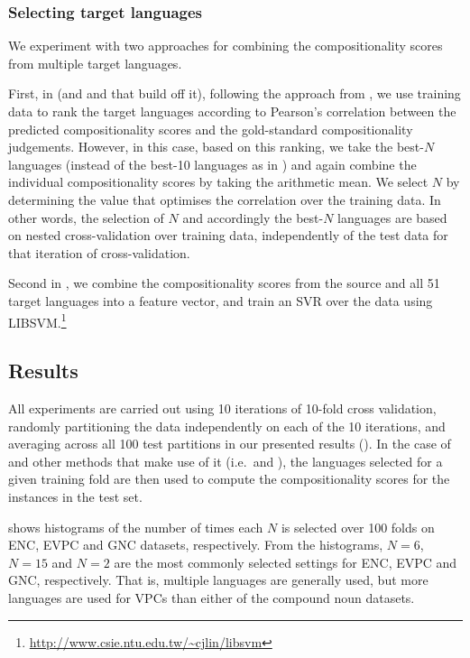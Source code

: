 \documentclass[output=paper,modfonts,nonflat]{langsci/langscibook}
\begin{document}
\subsubsection{Selecting target languages}
\label{sec:lang-selection}

We experiment with two approaches for combining the compositionality
scores from multiple target languages.

First, in \CStarg (and \CSsourcetarg and \CSall that build off it),
following the approach from , we use
training data to rank the target languages according to Pearson's
correlation between the predicted compositionality scores and the
gold-standard compositionality judgements. However, in this case,
based on this ranking, we take the best-$N$ languages (instead of the
best-10 languages as in ) and again
combine the individual compositionality scores by taking the
arithmetic mean. We select $N$ by determining the value that optimises
the correlation over the training data. In other words, the selection
of $N$ and accordingly the best-$N$ languages are based on nested
cross-validation over training data, independently of the test data
for that iteration of cross-validation.

Second in \CSsvr, we combine the compositionality scores from the
source and all 51 target languages into a feature vector, and train an
SVR over the data using
LIBSVM.\footnote{\smaller\url{http://www.csie.ntu.edu.tw/~cjlin/libsvm}}


\subsection{Results}

All experiments are carried out using 10 iterations of 10-fold cross
validation, randomly partitioning the data independently on each of the
10 iterations, and averaging across all 100 test partitions in our
presented results (). In the case of \CStarg and other methods that make
use of it (i.e.\ \CSsourcetarg and \CSall), the languages selected for a
given training fold are then used to compute the compositionality scores
for the instances in the test set. 

 shows histograms of the number of times each
$N$ is selected over 100 folds on ENC, EVPC and GNC datasets,
respectively. From the histograms, $N=6$, $N=15$ and $N=2$ are the
most commonly selected settings for ENC, EVPC and GNC,
respectively. That is, multiple languages are generally used, but more
languages are used for  VPCs than either of the compound noun
datasets.
\end{document}
